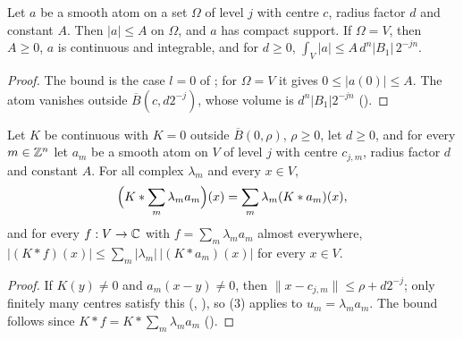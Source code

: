 \begin{lemma}
\label{lem:smooth-atoms-basic}
\leanok
{}
Let $a$ be a smooth atom on a set $\Omega$ of level $j$ with centre $c$, radius factor $d$ and
constant $A$. Then $|a| \leq A$ on $\Omega$, and $a$ has compact support. If $\Omega = V$, then
$A \geq 0$, $a$ is continuous and integrable, and for $d \geq 0$,
$\int_V |a| \leq A \, d^n |B_1| \, 2^{-jn}$.
\end{lemma}

\begin{proof}
\leanok
The bound is the case $l = 0$ of ; for $\Omega = V$ it gives
$0 \leq |a(0)| \leq A$. The atom vanishes outside $\overline B(c, d 2^{-j})$, whose volume is
$d^n |B_1| 2^{-jn}$ ().
\end{proof}

\begin{lemma}
\label{lem:conv-atom-series}
\leanok
{}
Let $K$ be continuous with $K = 0$ outside $\overline B(0, \rho)$, $\rho \geq 0$, let $d \geq 0$,
and for every $m \in \mathbb{Z}^n$ let $a_m$ be a smooth atom on $V$ of level $j$ with centre $c_{j,m}$,
radius factor $d$ and constant $A$. For all complex $\lambda_m$ and every $x \in V$,
\[
  \Bigl(K * \sum_m \lambda_m a_m\Bigr)(x) = \sum_m \lambda_m (K * a_m)(x) ,
\]
and for every $f : V \to \mathbb{C}$ with $f = \sum_m \lambda_m a_m$ almost everywhere,
$|(K * f)(x)| \leq \sum_m |\lambda_m| \, |(K * a_m)(x)|$ for every $x \in V$.
\end{lemma}

\begin{proof}
\leanok
If $K(y) \neq 0$ and $a_m(x - y) \neq 0$, then $\|x - c_{j,m}\| \leq \rho + d 2^{-j}$; only
finitely many centres satisfy this (, ), so
 (3) applies to $u_m = \lambda_m a_m$. The bound follows since
$K * f = K * \sum_m \lambda_m a_m$ ().
\end{proof}

